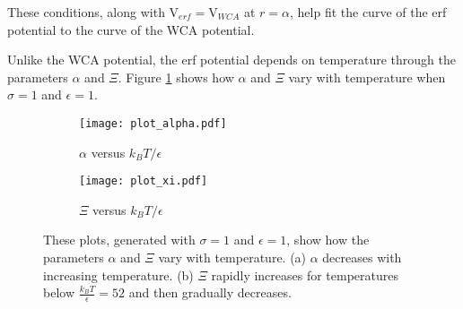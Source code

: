 \documentclass[12pt]{article}
\begin{document}
\noindent These conditions, along with V$_{erf}=$V$_{WCA}$ at $r=\alpha$, help fit the curve of the erf potential to the curve of the WCA potential.

Unlike the WCA potential, the erf potential depends on temperature through the parameters $\alpha$ and $\Xi$. Figure \ref{fig:alphaXivsT} shows how $\alpha$ and $\Xi$ vary with temperature when $\sigma=1$ and $\epsilon=1$. %

 \begin{figure}[h!]
    \centering
    \begin{subfigure}[b]{0.4\linewidth}
      \texttt{[image: plot\_alpha.pdf]}
      \caption{$\alpha$ versus $k_BT/\epsilon$}
    \end{subfigure} 
    \begin{subfigure}[b]{0.4\linewidth}
      \texttt{[image: plot\_xi.pdf]}
      \caption{$\Xi$ versus $k_BT/\epsilon$}
    \end{subfigure} 
    \caption{These plots, generated with $\sigma=1$ and $\epsilon=1$, show how the parameters $\alpha$ and $\Xi$ vary with temperature. (a) $\alpha$ decreases with increasing temperature. (b) $\Xi$ rapidly increases for temperatures below $\frac{k_BT}{\epsilon}=52$ and then gradually decreases.}
    \label{fig:alphaXivsT}
    \end{figure} 


\end{document}

